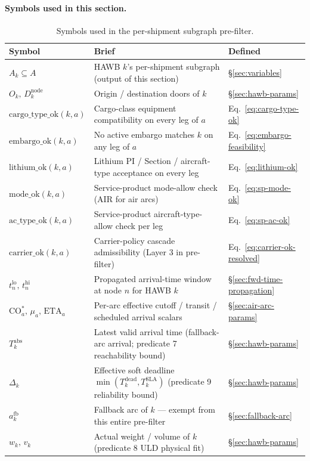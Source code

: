 \documentclass[11pt,a4paper]{article}
\theoremstyle{definition}
\begin{document}
\paragraph{Symbols used in this section.}
\begin{table}[H]
\centering
\caption{Symbols used in the per-shipment subgraph pre-filter.}
\label{tab:prefilter-syms}
\begin{tabular}{lp{9cm}p{3.5cm}}
\toprule
Symbol & Brief & Defined \\
\midrule
$A_k \subseteq A$ & HAWB $k$'s per-shipment subgraph (output of this section) & \S\ref{sec:variables} \\
$O_k,\, D_k^{\text{node}}$ & Origin / destination doors of $k$ & \S\ref{sec:hawb-params} \\
$\text{cargo\_type\_ok}(k, a)$ & Cargo-class equipment compatibility on every leg of $a$ & Eq.~\ref{eq:cargo-type-ok} \\
$\text{embargo\_ok}(k, a)$ & No active embargo matches $k$ on any leg of $a$ & Eq.~\ref{eq:embargo-feasibility} \\
$\text{lithium\_ok}(k, a)$ & Lithium PI / Section / aircraft-type acceptance on every leg & Eq.~\ref{eq:lithium-ok} \\
$\text{mode\_ok}(k, a)$ & Service-product mode-allow check (AIR for air arcs) & Eq.~\ref{eq:sp-mode-ok} \\
$\text{ac\_type\_ok}(k, a)$ & Service-product aircraft-type-allow check per leg & Eq.~\ref{eq:sp-ac-ok} \\
$\text{carrier\_ok}(k, a)$ & Carrier-policy cascade admissibility (Layer 3 in pre-filter) & Eq.~\ref{eq:carrier-ok-resolved} \\
$t^{\text{lo}}_n,\, t^{\text{hi}}_n$ & Propagated arrival-time window at node $n$ for HAWB $k$ & \S\ref{sec:fwd-time-propagation} \\
$\text{CO}_a^*,\, \mu_a,\, \text{ETA}_a$ & Per-arc effective cutoff / transit / scheduled arrival scalars & \S\ref{sec:air-arc-params} \\
$T_k^{\text{abs}}$ & Latest valid arrival time (fallback-arc arrival; predicate 7 reachability bound) & \S\ref{sec:hawb-params} \\
$\Delta_k$ & Effective soft deadline $\min(T_k^{\text{dead}}, T_k^{\text{SLA}})$ (predicate 9 reliability bound) & \S\ref{sec:hawb-params} \\
$a^{\text{fb}}_k$ & Fallback arc of $k$ --- exempt from this entire pre-filter & \S\ref{sec:fallback-arc} \\
$w_k,\, v_k$ & Actual weight / volume of $k$ (predicate 8 ULD physical fit) & \S\ref{sec:hawb-params} \\

\end{tabular}
\end{table}
\end{document}
